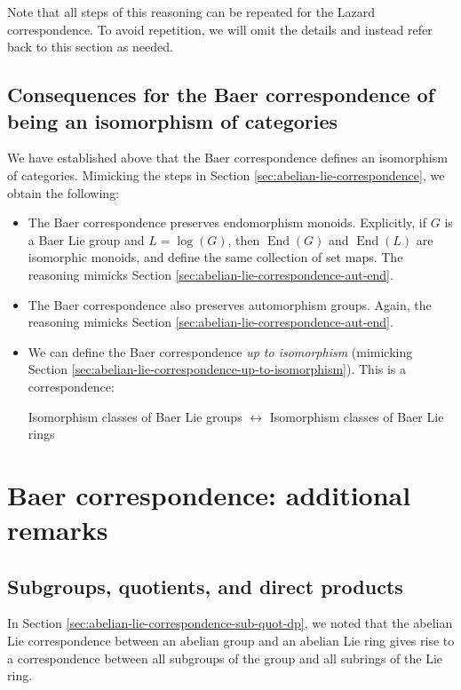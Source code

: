 \documentclass{ucetd}
\begin{document}
Note that all steps of this reasoning can be repeated for the Lazard
correspondence. To avoid repetition, we will omit the details and
instead refer back to this section as needed.

\subsection{Consequences for the Baer correspondence of being an isomorphism of categories}\label{sec:baer-correspondence-isocat-consequences}

We have established above that the Baer correspondence defines an
isomorphism of categories. Mimicking the steps in Section
\ref{sec:abelian-lie-correspondence}, we obtain the following:

\begin{itemize}
\item The Baer correspondence preserves endomorphism
  monoids. Explicitly, if $G$ is a Baer Lie group and $L = \log(G)$,
  then $\operatorname{End}(G)$ and $\operatorname{End}(L)$ are
  isomorphic monoids, and define the same collection of set maps. The
  reasoning mimicks Section
  \ref{sec:abelian-lie-correspondence-aut-end}.
\item The Baer correspondence also preserves automorphism
  groups. Again, the reasoning mimicks Section
  \ref{sec:abelian-lie-correspondence-aut-end}.
\item We can define the Baer correspondence {\em up to isomorphism}
  (mimicking Section
  \ref{sec:abelian-lie-correspondence-up-to-isomorphism}). This is a
  correspondence:

  \begin{center}
    Isomorphism classes of Baer Lie groups $\leftrightarrow$
    Isomorphism classes of Baer Lie rings
  \end{center}
\end{itemize}

\section{Baer correspondence: additional remarks}\label{sec:baer-correspondence-more}

\subsection{Subgroups, quotients, and direct products}\label{sec:baer-correspondence-sub-quot-dp}

In Section \ref{sec:abelian-lie-correspondence-sub-quot-dp}, we noted
that the abelian Lie correspondence between an abelian group and an
abelian Lie ring gives rise to a correspondence between all subgroups
of the group and all subrings of the Lie ring.
\end{document}
